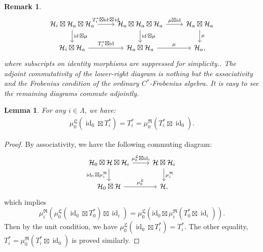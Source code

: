 \documentclass{article}
\newtheorem{lemma}{Lemma}
\newtheorem{remark}{Remark}
\newcommand{\hilb}{\mathcal{H}}
\begin{document}
\begin{remark}
\[\begin{tikzcd}
    \hilb_i \boxtimes \hilb_a \boxtimes \hilb_a  \arrow{r}{T_i^*\boxtimes\operatorname{id} \boxtimes \operatorname{id}} \arrow{d}{\operatorname{id}\boxtimes\mu}    &\hilb_a \boxtimes \hilb_a \boxtimes \hilb_a \arrow{r}{\mu\boxtimes\operatorname{id}} \arrow{d}{\operatorname{id}\boxtimes\mu}     & \hilb_a \boxtimes \hilb_a \arrow{d}{\mu} \\
    \hilb_i \boxtimes \hilb_a  \arrow{r}{T_i^* \boxtimes \operatorname{id}}                   &\hilb_a \boxtimes \hilb_a  \arrow{r}{\mu}       & \hilb_a,
\end{tikzcd}
\]
where subscripts on identity morphisms are suppressed for simplicity.. The adjoint commutativity of the lower-right diagram is nothing but the 
associativity and the Frobenius condition of the ordinary $C^*$-Frobenius algebra. It is easy to see the remaining diagrams commute adjointly. 



\end{remark}



\begin{lemma}\label{mu_0}
    For any $i\in \Lambda$, we have:
    \begin{align*}
        \mu_0^\mathfrak{L}(\operatorname{id}_0\boxtimes T_i^*)  = T_i^*  =  \mu_0^\mathfrak{R}(T_i^*\boxtimes \operatorname{id}_0). 
    \end{align*}
\end{lemma}
\begin{proof}
By associativity, we have the following commuting diagram: 
 \[\begin{tikzcd}
\hilb_0\boxtimes \hilb \boxtimes \hilb_i\arrow{r}{\mu_0^{\mathfrak{L}}\boxtimes\operatorname{id}_i} \arrow[swap]{d}{\operatorname{id}_0\boxtimes\mu_i^{\mathfrak{R}}} & \hilb\boxtimes\hilb_i \arrow{d}{\mu_i^{\mathfrak{R}}} \\%
\hilb_0\boxtimes \hilb \arrow{r}{\mu_0^{\mathfrak{L}}}& \hilb ,
\end{tikzcd}
\]
which implies 
\[
\mu_i^{\mathfrak{R}}\left( \mu_0^{\mathfrak{L}}(\operatorname{id}_0\boxtimes T_0^*)\boxtimes\operatorname{id}_i\right)  = 
\mu_0^{\mathfrak{L}}\left( \operatorname{id_0}\boxtimes \mu_i^{\mathfrak{R}}(T_0^*\boxtimes\operatorname{id}_i) \right).
\]
Then by the unit condition, we have $\mu_0^{\mathfrak{L}}(\operatorname{id}_0 \boxtimes T_i^*) = T_i^*$. The other equality,  $T_i^*  =  \mu_0^\mathfrak{R}(T_i^*\boxtimes \operatorname{id}_0)$ is proved similarly. 
\end{proof}
\end{document}
